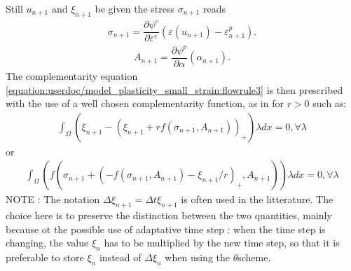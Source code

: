 \documentclass[a4paper,11pt,english]{sphinxmanual}
\begin{document}
Still \(u_{n+1} \mbox{ and } \xi_{n+1}\) be given the stress \(\sigma_{n+1}\) reads
\begin{equation*}
\begin{split}\sigma_{n+1} = \dfrac{\partial \psi^e}{\partial \varepsilon^e}(\varepsilon(u_{n+1}) -\varepsilon^p_{n+1}).\end{split}
\end{equation*}\begin{equation*}
\begin{split}A_{n+1} = \dfrac{\partial \psi^p}{\partial \alpha}(\alpha_{n+1}).\end{split}
\end{equation*}
The complementarity equation \eqref{equation:userdoc/model_plasticity_small_strain:flowrule3} is then prescribed with the use of a well chosen complementarity function, as in  for \(r > 0\) such as:
\begin{equation*}
\begin{split}\int_{\Omega} (\xi_{n+1} - (\xi_{n+1} + r f(\sigma_{n+1}, A_{n+1}))_+) \lambda dx = 0,   \forall \lambda\end{split}
\end{equation*}
or
\begin{equation*}
\begin{split}\int_{\Omega} (f(\sigma_{n+1} + (-f(\sigma_{n+1}, A_{n+1}) - \xi_{n+1}/r)_+ , A_{n+1}) ) \lambda dx = 0,   \forall \lambda\end{split}
\end{equation*}
NOTE : The notation \(\Delta \xi_{n+1} = \Delta t \xi_{n+1}\) is often used in the litterature. The choice here is to preserve the distinction between the two quantities, mainly because ot the possible use of adaptative time step : when the time step is changing, the value \(\xi_n\) has to be multiplied by the new time step, so that it is preferable to store \(\xi_n\) instead of \(\Delta \xi_{n}\) when using the \(\theta\)\sphinxhyphen{}scheme.
\end{document}
